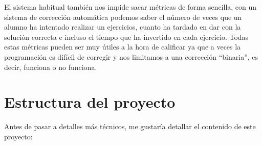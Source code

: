 \bigskip
El sistema habitual también nos impide sacar métricas de forma sencilla, con un sistema de corrección automática podemos saber el número de veces que un alumno ha intentado realizar un ejercicios, cuanto ha tardado en dar con la solución correcta e incluso el tiempo que ha invertido en cada ejercicio. Todas estas métricas pueden ser muy útiles a la hora de calificar ya que a veces la programación es difícil de corregir y nos limitamos a una corrección ``binaria'', es decir, funciona o no funciona.






\section{Estructura del proyecto}

\bigskip
Antes de pasar a detalles más técnicos, me gustaría detallar el contenido de este proyecto:

